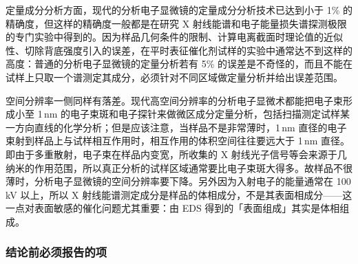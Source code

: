 定量成分分析方面，现代的分析电子显微镜的定量成分分析技术已达到小于 1\% 的精确度，但这样的精确度一般都是在研究 X 射线能谱和电子能量损失谱探测极限的专门实验中得到的。因为样品几何条件的限制、计算电离截面时理论值的近似性、切除背底强度引入的误差，在平时表征催化剂试样的实验中通常达不到这样的高度：普通的分析电子显微镜的定量分析若有 5\% 的误差是不奇怪的，而且不能在试样上只取一个谱测定其成分，必须针对不同区域做定量分析并给出误差范围。

空间分辨率一侧同样有落差。现代高空间分辨率的分析电子显微术都能把电子束形成小至 1\,nm 的电子束斑和电子探针来做微区成分定量分析，包括扫描测定试样某一方向直线的化学分析；但是应该注意，当样品不是非常薄时，1\,nm 直径的电子束射到样品上与试样相互作用时，相互作用的体积空间往往要远大于 1\,nm 直径。即由于多重散射，电子束在样品内变宽，所收集的 X 射线光子信号等会来源于几纳米的作用范围，所以真正分析的试样区域通常要比电子束斑大得多。故样品不很薄时，分析电子显微镜的空间分辨率要下降。另外因为入射电子的能量通常在 100\,kV 以上，所以 X 射线能谱测定成分是样品的体相成分，不是其表面相成分——这一点对表面敏感的催化问题尤其重要：由 EDS 得到的「表面组成」其实是体相组成。

\subsubsection{结论前必须报告的项}

